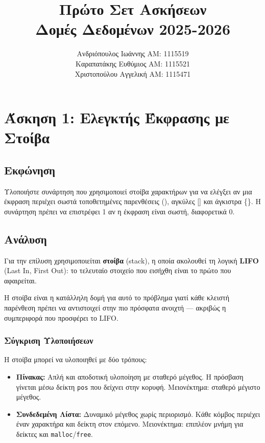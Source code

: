 \documentclass[a4paper,12pt]{article}
\title{Πρώτο Σετ Ασκήσεων \\ Δομές Δεδομένων 2025-2026}
\author{
	Ανδριόπουλος Ιωάννης ΑΜ: 1115519\\
	Καραπατάκης Ευθύμιος ΑΜ: 1115521\\
	Χριστοπούλου Αγγελική ΑΜ: 1115471
}
\date{}
\begin{document}
	
	\maketitle
	\tableofcontents
	\newpage
	
	\section{Άσκηση 1: Ελεγκτής Έκφρασης με Στοίβα}
	
	\subsection{Εκφώνηση}
	Υλοποιήστε συνάρτηση που χρησιμοποιεί στοίβα χαρακτήρων για να ελέγξει αν μια 
	έκφραση περιέχει σωστά τοποθετημένες παρενθέσεις (), αγκύλες [] και άγκιστρα \{\}. 
	Η συνάρτηση πρέπει να επιστρέφει 1 αν η έκφραση είναι σωστή, διαφορετικά 0.
	
	\subsection{Ανάλυση}
	Για την επίλυση χρησιμοποιείται \textbf{στοίβα} (stack), η οποία ακολουθεί τη 
	λογική \textbf{LIFO} (Last In, First Out): το τελευταίο στοιχείο που εισήχθη 
	είναι το πρώτο που αφαιρείται.
	
	Η στοίβα είναι η κατάλληλη δομή για αυτό το πρόβλημα γιατί κάθε κλειστή 
	παρένθεση πρέπει να αντιστοιχεί στην πιο πρόσφατα ανοιχτή — ακριβώς η 
	συμπεριφορά που προσφέρει το LIFO.
	
	\subsubsection{Σύγκριση Υλοποιήσεων}
	Η στοίβα μπορεί να υλοποιηθεί με δύο τρόπους:
	
	\begin{itemize}
		\item \textbf{Πίνακας:} Απλή και αποδοτική υλοποίηση με σταθερό μέγεθος. 
		Η πρόσβαση γίνεται μέσω δείκτη \texttt{pos} που δείχνει στην κορυφή. 
		Μειονέκτημα: σταθερό μέγιστο μέγεθος.
		
		\item \textbf{Συνδεδεμένη Λίστα:} Δυναμικό μέγεθος χωρίς περιορισμό. 
		Κάθε κόμβος περιέχει έναν χαρακτήρα και δείκτη στον επόμενο. 
		Μειονέκτημα: επιπλέον μνήμη για δείκτες και \texttt{malloc}/\texttt{free}.
	\end{itemize}
	
\end{document}

